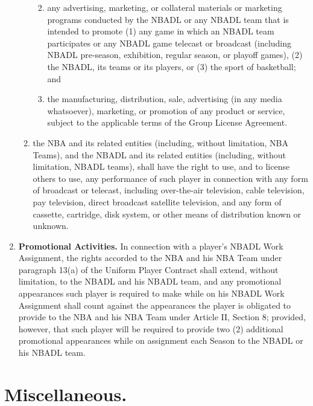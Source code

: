 \documentclass[
]{book}
\providecommand{\tightlist}{%
  \setlength{\itemsep}{0pt}\setlength{\parskip}{0pt}}
\begin{document}
\begin{enumerate}
\begin{enumerate}
    \begin{enumerate}
    \def\labelenumiii{(\arabic{enumiii})}
    \tightlist
    \item
      any advertising, marketing, or collateral materials or marketing programs conducted by the NBADL or any NBADL team that is intended to promote (1) any game in which an NBADL team participates or any NBADL game telecast or broadcast (including NBADL pre-season, exhibition, regular season, or playoff games), (2) the NBADL, its teams or its players, or (3) the sport of basketball; and
    \item
      the manufacturing, distribution, sale, advertising (in any media whatsoever), marketing, or promotion of any product or service, subject to the applicable terms of the Group License Agreement.
    \end{enumerate}
  \item
    the NBA and its related entities (including, without limitation, NBA Teams), and the NBADL and its related entities (including, without limitation, NBADL teams), shall have the right to use, and to license others to use, any performance of such player in connection with any form of broadcast or telecast, including over-the-air television, cable television, pay television, direct broadcast satellite television, and any form of cassette, cartridge, disk system, or other means of distribution known or unknown.
  \end{enumerate}
\item
  \textbf{Promotional Activities.} In connection with a player's NBADL Work Assignment, the rights accorded to the NBA and his NBA Team under paragraph 13(a) of the Uniform Player Contract shall extend, without limitation, to the NBADL and his NBADL team, and any promotional appearances such player is required to make while on his NBADL Work Assignment shall count against the appearances the player is obligated to provide to the NBA and his NBA Team under Article II, Section 8; provided, however, that such player will be required to provide two (2) additional promotional appearances while on assignment each Season to the NBADL or his NBADL team.
\end{enumerate}

\hypertarget{miscellaneous.-2}{%
\section{Miscellaneous.}\label{miscellaneous.-2}}
\end{document}
